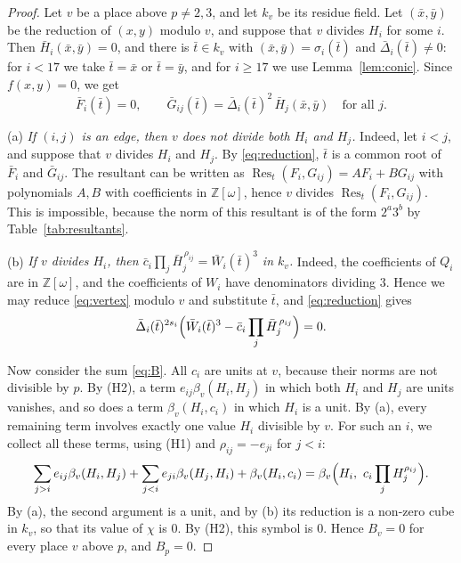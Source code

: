 \documentclass[11pt]{article}
\newcommand{\Z}{\mathbb{Z}}
\begin{document}
\begin{proof}
Let $v$ be a place above $p\neq2,3$, and let $k_v$ be its residue field. Let $(\bar x,\bar y)$ be the reduction of $(x,y)$ modulo $v$, and suppose that $v$ divides $H_i$ for some $i$. Then $\bar H_i(\bar x,\bar y)=0$, and there is $\bar t\in k_v$ with $(\bar x,\bar y)=\sigma_i(\bar t)$ and $\bar\Delta_i(\bar t)\neq0$: for $i<17$ we take $\bar t=\bar x$ or $\bar t=\bar y$, and for $i\geq17$ we use Lemma~\ref{lem:conic}. Since $f(x,y)=0$, we get
\begin{equation}\label{eq:reduction}
\bar F_i(\bar t)=0,\qquad\bar G_{ij}(\bar t)=\bar\Delta_i(\bar t)^2\,\bar H_j(\bar x,\bar y)\quad\text{for all }j.
\end{equation}

(a) \emph{If $(i,j)$ is an edge, then $v$ does not divide both $H_i$ and $H_j$.} Indeed, let $i<j$, and suppose that $v$ divides $H_i$ and $H_j$. By \eqref{eq:reduction}, $\bar t$ is a common root of $\bar F_i$ and $\bar G_{ij}$. The resultant can be written as $\operatorname{Res}_t(F_i,G_{ij})=AF_i+BG_{ij}$ with polynomials $A,B$ with coefficients in $\Z[\omega]$, hence $v$ divides $\operatorname{Res}_t(F_i,G_{ij})$. This is impossible, because the norm of this resultant is of the form $2^a3^b$ by Table~\ref{tab:resultants}.

(b) \emph{If $v$ divides $H_i$, then $\bar c_i\prod_j\bar H_j^{\,\rho_{ij}}=\bar W_i(\bar t)^3$ in $k_v$.} Indeed, the coefficients of $Q_i$ are in $\Z[\omega]$, and the coefficients of $W_i$ have denominators dividing $3$. Hence we may reduce \eqref{eq:vertex} modulo $v$ and substitute $\bar t$, and \eqref{eq:reduction} gives
\[
\bar\Delta_i(\bar t)^{2s_i}\Bigl(\bar W_i(\bar t)^3-\bar c_i\prod_j\bar H_j^{\,\rho_{ij}}\Bigr)=0.
\]

Now consider the sum \eqref{eq:B}. All $c_i$ are units at $v$, because their norms are not divisible by $p$. By (H2), a term $e_{ij}\beta_v(H_i,H_j)$ in which both $H_i$ and $H_j$ are units vanishes, and so does a term $\beta_v(H_i,c_i)$ in which $H_i$ is a unit. By (a), every remaining term involves exactly one value $H_i$ divisible by $v$. For such an $i$, we collect all these terms, using (H1) and $\rho_{ij}=-e_{ji}$ for $j<i$:
\[
\sum_{j>i}e_{ij}\beta_v(H_i,H_j)+\sum_{j<i}e_{ji}\beta_v(H_j,H_i)+\beta_v(H_i,c_i)
=\beta_v\Bigl(H_i,\ c_i\prod_jH_j^{\rho_{ij}}\Bigr).
\]
By (a), the second argument is a unit, and by (b) its reduction is a non-zero cube in $k_v$, so that its value of $\chi$ is $0$. By (H2), this symbol is $0$. Hence $B_v=0$ for every place $v$ above $p$, and $B_p=0$.
\end{proof}
\end{document}

